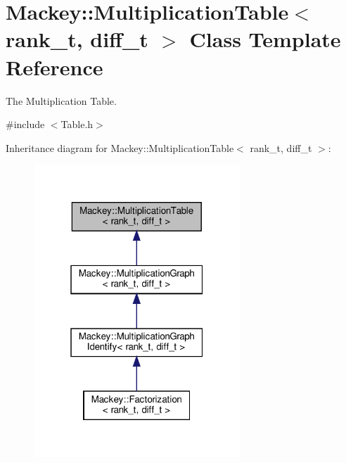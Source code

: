 \hypertarget{classMackey_1_1MultiplicationTable}{}\section{Mackey\+:\+:Multiplication\+Table$<$ rank\+\_\+t, diff\+\_\+t $>$ Class Template Reference}
\label{classMackey_1_1MultiplicationTable}


The Multiplication Table.  




{\ttfamily \#include $<$Table.\+h$>$}



Inheritance diagram for Mackey\+:\+:Multiplication\+Table$<$ rank\+\_\+t, diff\+\_\+t $>$\+:\nopagebreak
\begin{figure}[H]
\begin{center}
\leavevmode
\includegraphics[width=220pt]{classMackey_1_1MultiplicationTable__inherit__graph}
\end{center}
\end{figure}
